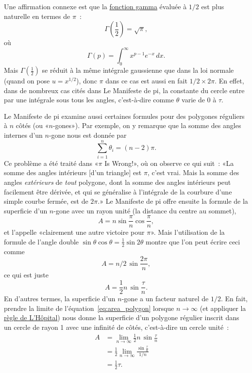 Une affirmation connexe est que la
\href{https://fr.wikipedia.org/wiki/Fonction_gamma}{fonction gamma} évaluée à
$1/2$ est plus naturelle en termes de $\pi$~:
\[
\Gamma(\textstyle{\frac{1}{2}}) = \sqrt{\pi},
\]
où
\begin{equation}
\label{eq:gamma}
\Gamma(p) = \int_{0}^{\infty} x^{p-1} e^{-x}\,dx.
\end{equation}
Mais $\Gamma(\frac{1}{2})$ se réduit à la même intégrale gaussienne que dans la
loi normale (quand on pose $u = x^{1/2}$), donc $\pi$ dans ce cas est aussi
en fait $1/2\times 2\pi$. En effet, dans de nombreux cas cités dans Le
Manifeste de pi, la constante du cercle entre par une intégrale sous tous les
angles, c'est-à-dire comme $\theta$ varie de $0$ à $\tau$.

Le Manifeste de pi examine aussi certaines formules pour des polygones réguliers
à $n$ côtés (ou «\ns $n$-gones\ns »). Par exemple, on y remarque que la somme des angles
internes d'un $n$-gone nous est donnée par
\[
\sum_{i=1}^n \theta_i=(n-2)\pi.
\]
Ce problème a été traité dans «\ns $\pi$ Is Wrong!\ns », où on observe ce qui suit~:
«\ns La somme des angles intérieurs [d'un triangle] est $\pi$, c'est vrai. Mais la
somme des angles \emph{extérieurs} de \emph{tout} polygone, dont la somme des
angles intérieurs peut facilement être dérivée, et qui se généralise à
l'intégrale de la courbure d'une simple courbe fermée, est de $2\pi$.\ns » Le 
Manifeste de pi offre ensuite la formule de la superficie d'un $n$-gone avec un
rayon unité (la distance du centre au sommet),
\[ A=n\sin\frac{\pi}{n}\cos\frac{\pi}{n}, \]
et l'appelle «\ns clairement\textellipsis{} une autre victoire pour $\pi$\ns ». Mais
l'utilisation de la formule de l'angle double $\sin\theta\cos\theta =
\frac{1}{2}\sin2\theta$ montre que l'on peut écrire ceci comme
\[ A = n/2\, \sin\frac{2\pi}{n}, \]
ce qui est juste
\begin{equation}
\label{eq:area_polygon}
A = \frac{1}{2} n\, \sin\frac{\tau}{n}.
\end{equation}
En d'autres termes, la superficie d'un $n$-gone a un facteur
naturel de $1/2$. En fait, prendre la limite de
l'équation~\eqref{eq:area_polygon} lorsque $n\rightarrow \infty$ (et appliquer la
\href{https://fr.wikipedia.org/wiki/R%C3%A8gle_de_L%27H%C3%B4pital}{règle de
L'Hôpital}) nous donne la superficie d'un polygone régulier inscrit dans un cercle de rayon 1 avec une infinité
de côtés, c'est-à-dire un cercle unité~:
\begin{equation}
\label{eq:lhopital}
\begin{split}
A & = \lim_{n\rightarrow\infty} \frac{1}{2} n\, \sin\frac{\tau}{n} \\
  & = \frac{1}{2} \lim_{n\rightarrow\infty} \frac{\sin\frac{\tau}{n}}{1/n} \\
  & = \tfrac{1}{2}\tau.
\end{split}
\end{equation}

